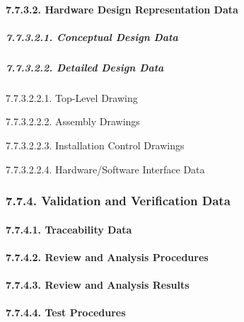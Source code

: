 \documentclass[
]{article}
\begin{document}
\hypertarget{hardware-design-representation-data-1}{%
\paragraph{7.7.3.2. Hardware Design Representation
Data}\label{hardware-design-representation-data-1}}

\hypertarget{conceptual-design-data-1}{%
\subparagraph{7.7.3.2.1. Conceptual Design
Data}\label{conceptual-design-data-1}}

\hypertarget{detailed-design-data-1}{%
\subparagraph{7.7.3.2.2. Detailed Design
Data}\label{detailed-design-data-1}}

7.7.3.2.2.1. Top-Level Drawing

7.7.3.2.2.2. Assembly Drawings

7.7.3.2.2.3. Installation Control Drawings

7.7.3.2.2.4. Hardware/Software Interface Data

\hypertarget{validation-and-verification-data-1}{%
\subsubsection{7.7.4. Validation and Verification
Data}\label{validation-and-verification-data-1}}

\hypertarget{traceability-data-1}{%
\paragraph{7.7.4.1. Traceability Data}\label{traceability-data-1}}

\hypertarget{review-and-analysis-procedures-1}{%
\paragraph{7.7.4.2. Review and Analysis
Procedures}\label{review-and-analysis-procedures-1}}

\hypertarget{review-and-analysis-results-1}{%
\paragraph{7.7.4.3. Review and Analysis
Results}\label{review-and-analysis-results-1}}

\hypertarget{test-procedures-1}{%
\paragraph{7.7.4.4. Test Procedures}\label{test-procedures-1}}
\end{document}
